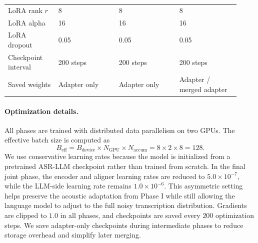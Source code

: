 \documentclass{article}
\begin{document}
\begin{table}[t]
\begin{tabular}{p{0.20\linewidth} p{0.24\linewidth} p{0.24\linewidth} p{0.24\linewidth}}
LoRA rank $r$
& 8
& 8
& 8 \\

LoRA alpha
& 16
& 16
& 16 \\

LoRA dropout
& 0.05
& 0.05
& 0.05 \\

Checkpoint interval
& 200 steps
& 200 steps
& 200 steps \\

Saved weights
& Adapter only
& Adapter only
& Adapter / merged adapter \\
\bottomrule
\end{tabular}
\vspace{-2mm}
\end{table}

\paragraph{Optimization details.}
All phases are trained with distributed data parallelism on two GPUs. The
effective batch size is computed as
\[
B_{\mathrm{eff}}
=
B_{\mathrm{device}}
\times N_{\mathrm{GPU}}
\times N_{\mathrm{accum}}
=
8 \times 2 \times 8
=
128.
\]
We use conservative learning rates because the model is initialized from a
pretrained ASR-LLM checkpoint rather than trained from scratch. In the final joint
phase, the encoder and aligner learning rates are reduced to
$5.0\times10^{-7}$, while the LLM-side learning rate remains
$1.0\times10^{-6}$. This asymmetric setting helps preserve the acoustic
adaptation from Phase I while still allowing the language model to adjust to the
full noisy transcription distribution. Gradients are clipped to $1.0$ in all
phases, and checkpoints are saved every $200$ optimization steps. We save
adapter-only checkpoints during intermediate phases to reduce storage overhead
and simplify later merging.
\end{document}
